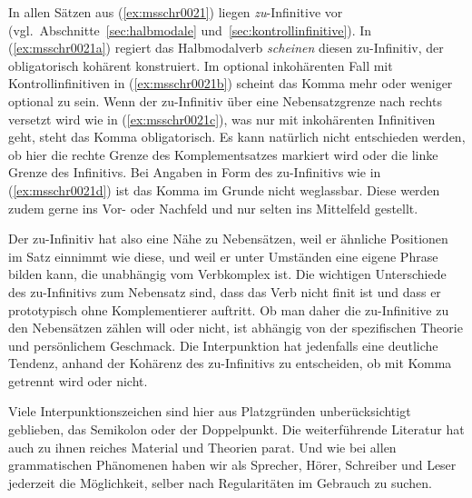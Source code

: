 In allen Sätzen aus (\ref{ex:msschr0021}) liegen \textit{zu}-Infinitive vor (vgl.\ Abschnitte~\ref{sec:halbmodale} und~\ref{sec:kontrollinfinitive}).
In (\ref{ex:msschr0021a}) regiert das Halbmodalverb \textit{scheinen} diesen zu-Infinitiv, der obligatorisch kohärent konstruiert.
Im optional inkohärenten Fall mit Kontrollinfinitiven in (\ref{ex:msschr0021b}) scheint das Komma mehr oder weniger optional zu sein.
Wenn der zu-Infinitiv über eine Nebensatzgrenze nach rechts versetzt wird wie in (\ref{ex:msschr0021c}), was nur mit inkohärenten Infinitiven geht, steht das Komma obligatorisch.
Es kann natürlich nicht entschieden werden, ob hier die rechte Grenze des Komplementsatzes markiert wird oder die linke Grenze des Infinitivs.
Bei Angaben in Form des zu-Infinitivs wie in (\ref{ex:msschr0021d}) ist das Komma im Grunde nicht weglassbar.
Diese werden zudem gerne ins Vor- oder Nachfeld und nur selten ins Mittelfeld gestellt.

Der zu-Infinitiv hat also eine Nähe zu Nebensätzen, weil er ähnliche Positionen im Satz einnimmt wie diese, und weil er unter Umständen eine eigene Phrase bilden kann, die unabhängig vom Verbkomplex ist.
Die wichtigen Unterschiede des zu-Infinitivs zum Nebensatz sind, dass das Verb nicht finit ist und dass er prototypisch ohne Komplementierer auftritt.
Ob man daher die zu-Infinitive zu den Nebensätzen zählen will oder nicht, ist abhängig von der spezifischen Theorie und persönlichem Geschmack.
Die Interpunktion hat jedenfalls eine deutliche Tendenz, anhand der Kohärenz des zu-Infinitivs zu entscheiden, ob mit Komma getrennt wird oder nicht.

Viele Interpunktionszeichen sind hier aus Platzgründen unberücksichtigt geblieben, \zB das Semikolon oder der Doppelpunkt.
Die weiterführende Literatur hat auch zu ihnen reiches Material und Theorien parat.
Und wie bei allen grammatischen Phänomenen haben wir als Sprecher, Hörer, Schreiber und Leser jederzeit die Möglichkeit, selber nach Regularitäten im Gebrauch zu suchen.




